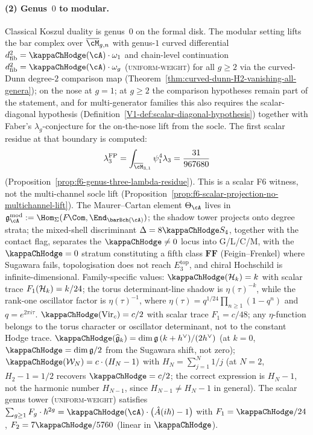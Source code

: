 \paragraph{(2) Genus~$0$ to modular.}
Classical Koszul duality is genus~$0$ on the formal disk. The
modular setting lifts the bar complex over
$\overline{\cM}_{g,n}$ with genus-$1$ curved differential
$d_{\mathrm{fib}}^2 = \kappaChHodge(\cA)\cdot\omega_1$
and chain-level continuation
$d_{\mathrm{fib}}^2 = \kappaChHodge(\cA)\cdot\omega_g$
\textup{(\textsc{uniform-weight})} for all $g \ge 2$ via
the curved-Dunn degree-$2$ comparison map
(Theorem~\ref{thm:curved-dunn-H2-vanishing-all-genera});
on the nose at $g = 1$; at $g \ge 2$ the comparison hypotheses remain
part of the statement, and for multi-generator families this also
requires the
scalar-diagonal hypothesis
(Definition~\ref{V1-def:scalar-diagonal-hypothesis}) together with
Faber's $\lambda_g$-conjecture for the on-the-nose lift from
the socle. The first scalar residue at that boundary is computed:
\[
 \lambda_3^{\mathrm{FP}}
 =
 \int_{\overline{\cM}_{3,1}}\psi_1^4\lambda_3
 =
 \frac{31}{967680}
\]
(Proposition~\ref{prop:f6-genus-three-lambda-residue}). This is a
scalar F6 witness, not the multi-channel socle lift
(Proposition~\ref{prop:f6-scalar-projection-no-multichannel-lift}).
The
Maurer--Cartan element $\Theta_\cA$ lives in
$\gAmod := \Hom_\Sigma(F\!\Com, \End_{\barBch(\cA)})$; the shadow
tower projects onto degree strata; the mixed-shell discriminant
$\Delta = 8\kappaChHodge S_4$, together with the contact flag,
separates the $\kappaChHodge \neq 0$ locus into G/L/C/M, with the
$\kappaChHodge = 0$ stratum constituting a fifth class
$\mathbf{FF}$ (Feigin--Frenkel) where Sugawara fails,
topologisation does not reach $E_3^{\mathrm{top}}$, and chiral
Hochschild is infinite-dimensional. Family-specific values:
$\kappaChHodge(\cH_k) = k$ with scalar trace
$F_1(\mathcal{H}_k)=k/24$; the torus determinant-line shadow is
$\eta(\tau)^{-k}$, while the rank-one oscillator factor is
$\eta(\tau)^{-1}$, where
$\eta(\tau) = q^{1/24}\prod_{n \ge 1}(1 - q^n)$ and
$q = e^{2\pi i \tau}$.
$\kappaChHodge(\mathrm{Vir}_c) = c/2$ with scalar trace
$F_1 = c/48$; any $\eta$-function belongs to the torus character or
oscillator determinant, not to the constant Hodge trace.
$\kappaChHodge(\widehat{\fg}_k) = \dim\fg\,(k+h^\vee)/(2h^\vee)$
(at $k = 0$, $\kappaChHodge = \dim\fg/2$ from the
Sugawara shift, not zero); $\kappaChHodge(\cW_N) =
c\cdot(H_N - 1)$ with $H_N = \sum_{j=1}^N 1/j$ (at $N = 2$,
$H_2 - 1 = 1/2$ recovers $\kappaChHodge = c/2$; the correct expression
is $H_N - 1$, not the harmonic number $H_{N-1}$, since
$H_{N-1} \ne H_N - 1$ in general). The scalar genus tower
\textup{(\textsc{uniform-weight})} satisfies
$\sum_{g \ge 1} F_g \cdot \hbar^{2g}
= \kappaChHodge(\cA)\cdot\bigl(\hat{A}(i\hbar) - 1\bigr)$
with $F_1 = \kappaChHodge/24$,
$F_2 = 7\kappaChHodge/5760$ (linear in $\kappaChHodge$).

